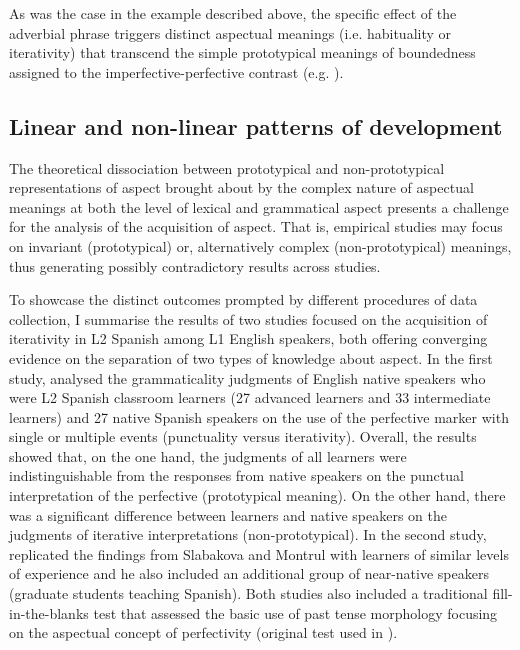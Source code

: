 \documentclass[output=paper,modfonts,nonflat,newtxmath]{langsci/langscibook}
\begin{document}
As was the case in the example described above, the specific effect of the adverbial phrase triggers distinct aspectual meanings (i.e. habituality or iterativity) that transcend the simple prototypical meanings of boundedness assigned to the imperfective-perfective contrast (e.g. \citealt{SlabakovaMontrul2007, Scholes2008,Salaberry2013}).

\subsection{{Linear} {and} {non-linear} {patterns} {of} {development}}
\label{sec:salaberry:1.3}

The theoretical dissociation between prototypical and non-prototypical representations of aspect brought about by the complex nature of aspectual meanings at both the level of lexical and grammatical aspect presents a challenge for the analysis of the acquisition of aspect. That is, empirical studies may focus on invariant (prototypical) or, alternatively complex (non-prototypical) meanings, thus generating possibly contradictory results across studies.

To showcase the distinct outcomes prompted by different procedures of data collection, I summarise the results of two studies focused on the acquisition of iterativity in L2 Spanish among L1 English speakers, both offering converging evidence on the separation of two types of knowledge about aspect. In the first study, \citet{SlabakovaMontrul2007} analysed the grammaticality judgments of English native speakers who were L2 Spanish classroom learners (27 advanced learners and 33 intermediate learners) and 27 native Spanish speakers on the use of the perfective marker with single or multiple events (punctuality versus iterativity). Overall, the results showed that, on the one hand, the judgments of all learners were indistinguishable from the responses from native speakers on the punctual interpretation of the perfective (prototypical meaning). On the other hand, there was a significant difference between learners and native speakers on the judgments of iterative interpretations (non-prototypical). In the second study, \citet{Scholes2008} replicated the findings from Slabakova and Montrul with learners of similar levels of experience and he also included an additional group of near-native speakers (graduate students teaching Spanish). Both studies also included a traditional fill-in-the-blanks test that assessed the basic use of past tense morphology focusing on the aspectual concept of perfectivity (original test used in \citealt{Salaberry1999}).
\end{document}

